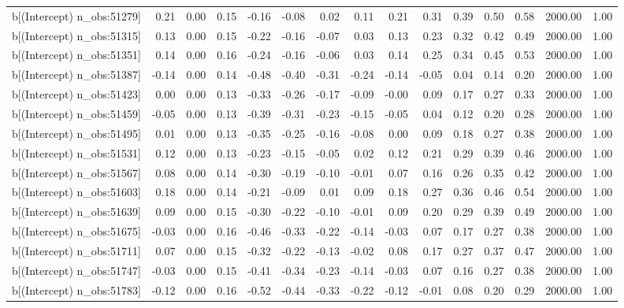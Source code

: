 \begin{table}[ht]
\begin{tabular}{rrrrrrrrrrrrrrr}
  b[(Intercept) n\_obs:51279] & 0.21 & 0.00 & 0.15 & -0.16 & -0.08 & 0.02 & 0.11 & 0.21 & 0.31 & 0.39 & 0.50 & 0.58 & 2000.00 & 1.00 \\ 
  b[(Intercept) n\_obs:51315] & 0.13 & 0.00 & 0.15 & -0.22 & -0.16 & -0.07 & 0.03 & 0.13 & 0.23 & 0.32 & 0.42 & 0.49 & 2000.00 & 1.00 \\ 
  b[(Intercept) n\_obs:51351] & 0.14 & 0.00 & 0.16 & -0.24 & -0.16 & -0.06 & 0.03 & 0.14 & 0.25 & 0.34 & 0.45 & 0.53 & 2000.00 & 1.00 \\ 
  b[(Intercept) n\_obs:51387] & -0.14 & 0.00 & 0.14 & -0.48 & -0.40 & -0.31 & -0.24 & -0.14 & -0.05 & 0.04 & 0.14 & 0.20 & 2000.00 & 1.00 \\ 
  b[(Intercept) n\_obs:51423] & 0.00 & 0.00 & 0.13 & -0.33 & -0.26 & -0.17 & -0.09 & -0.00 & 0.09 & 0.17 & 0.27 & 0.33 & 2000.00 & 1.00 \\ 
  b[(Intercept) n\_obs:51459] & -0.05 & 0.00 & 0.13 & -0.39 & -0.31 & -0.23 & -0.15 & -0.05 & 0.04 & 0.12 & 0.20 & 0.28 & 2000.00 & 1.00 \\ 
  b[(Intercept) n\_obs:51495] & 0.01 & 0.00 & 0.13 & -0.35 & -0.25 & -0.16 & -0.08 & 0.00 & 0.09 & 0.18 & 0.27 & 0.38 & 2000.00 & 1.00 \\ 
  b[(Intercept) n\_obs:51531] & 0.12 & 0.00 & 0.13 & -0.23 & -0.15 & -0.05 & 0.02 & 0.12 & 0.21 & 0.29 & 0.39 & 0.46 & 2000.00 & 1.00 \\ 
  b[(Intercept) n\_obs:51567] & 0.08 & 0.00 & 0.14 & -0.30 & -0.19 & -0.10 & -0.01 & 0.07 & 0.16 & 0.26 & 0.35 & 0.42 & 2000.00 & 1.00 \\ 
  b[(Intercept) n\_obs:51603] & 0.18 & 0.00 & 0.14 & -0.21 & -0.09 & 0.01 & 0.09 & 0.18 & 0.27 & 0.36 & 0.46 & 0.54 & 2000.00 & 1.00 \\ 
  b[(Intercept) n\_obs:51639] & 0.09 & 0.00 & 0.15 & -0.30 & -0.22 & -0.10 & -0.01 & 0.09 & 0.20 & 0.29 & 0.39 & 0.49 & 2000.00 & 1.00 \\ 
  b[(Intercept) n\_obs:51675] & -0.03 & 0.00 & 0.16 & -0.46 & -0.33 & -0.22 & -0.14 & -0.03 & 0.07 & 0.17 & 0.27 & 0.38 & 2000.00 & 1.00 \\ 
  b[(Intercept) n\_obs:51711] & 0.07 & 0.00 & 0.15 & -0.32 & -0.22 & -0.13 & -0.02 & 0.08 & 0.17 & 0.27 & 0.37 & 0.47 & 2000.00 & 1.00 \\ 
  b[(Intercept) n\_obs:51747] & -0.03 & 0.00 & 0.15 & -0.41 & -0.34 & -0.23 & -0.14 & -0.03 & 0.07 & 0.16 & 0.27 & 0.38 & 2000.00 & 1.00 \\ 
  b[(Intercept) n\_obs:51783] & -0.12 & 0.00 & 0.16 & -0.52 & -0.44 & -0.33 & -0.22 & -0.12 & -0.01 & 0.08 & 0.20 & 0.29 & 2000.00 & 1.00 \\ 

\end{tabular}
\end{table}
